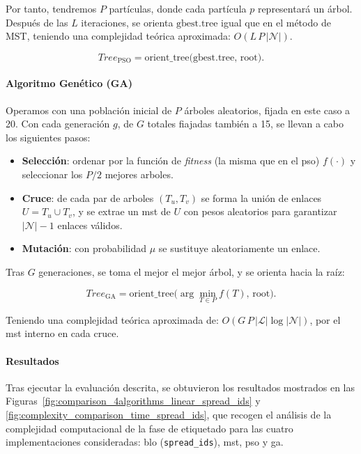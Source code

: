 Por tanto, tendremos \(P\) partículas, donde cada partícula  \(p\) representará un árbol. Después de las $L$ iteraciones, se orienta \(\mathrm{gbest.tree}\) igual que en el método de MST, teniendo una complejidad teórica aproximada: \(O(L\,P\,|\mathcal{N}|)\).

\begin{equation}
Tree_{\mathrm{PSO}} = \mathrm{orient\_tree}\bigl(\mathrm{gbest.tree},\,\mathrm{root}\bigr).
\end{equation}


\paragraph{Algoritmo Genético (GA)} Operamos con una población inicial de \(P\) árboles aleatorios, fijada en este caso a 20. Con cada generación \(g\), de $G$ totales fiajadas también a 15, se llevan a cabo los siguientes pasos:

\begin{itemize}
  \item \textbf{Selección}: ordenar por la función de \textit{fitness} (la misma que en el \gls{pso}) \(f(\cdot)\) y seleccionar los \(P/2\) mejores arboles.  
  
  \item \textbf{Cruce}: de cada par de arboles \((T_u,T_v)\) se forma la unión de enlaces 
    \(U = T_u\cup T_v\), y se extrae un \gls{mst} de \(U\) con pesos aleatorios para garantizar 
    \(|\mathcal{N}|-1\) enlaces válidos.  
    
  \item \textbf{Mutación}: con probabilidad \(\mu\) se sustituye aleatoriamente un enlace.  
\end{itemize}

Tras \(G\) generaciones, se toma el mejor el mejor árbol, y se orienta hacia la raíz:

\begin{equation}
Tree_{\mathrm{GA}} = \mathrm{orient\_tree}\bigl(\arg\min_{T\in P}f(T),\,\mathrm{root}\bigr).
\end{equation}

Teniendo una complejidad teórica aproximada de: \(O(G\,P\,|\mathcal{L}|\log|\mathcal{N}|)\), por el \gls{mst} interno en cada cruce.


\paragraph{Resultados} Tras ejecutar la evaluación descrita, se obtuvieron los resultados mostrados en las Figuras~\ref{fig:comparison_4algorithms_linear_spread_ids} y \ref{fig:complexity_comparison_time_spread_ids}, que recogen el análisis de la complejidad computacional de la fase de etiquetado para las cuatro implementaciones consideradas: \gls{blo} (\texttt{spread\_ids}), \gls{mst}, \gls{pso} y \gls{ga}.  

